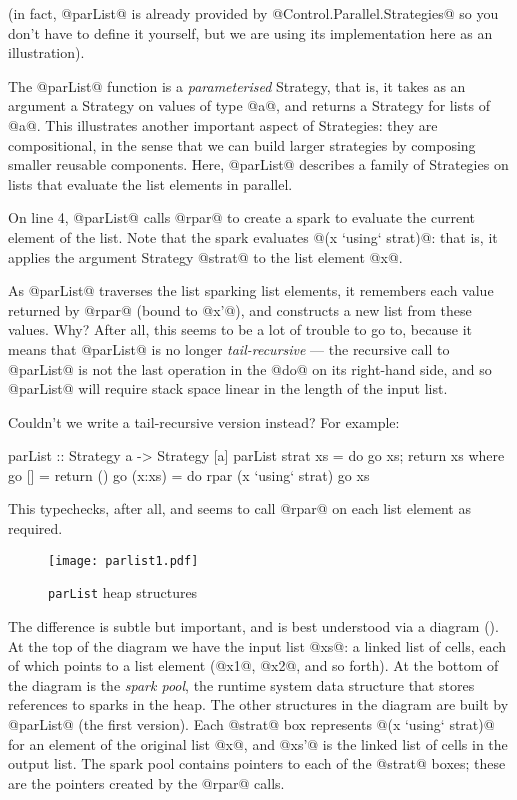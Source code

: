 \noindent (in fact, @parList@ is already provided by
@Control.Parallel.Strategies@ so you don't have to define it yourself,
but we are using its implementation here as an illustration).

The @parList@ function is a \emph{parameterised} Strategy, that is, it
takes as an argument a Strategy on values of type @a@, and returns a
Strategy for lists of @a@.  This illustrates another important aspect
of Strategies: they are compositional, in the sense that we can build
larger strategies by composing smaller reusable components.  Here,
@parList@ describes a family of Strategies on lists that evaluate the
list elements in parallel.

On line 4, @parList@ calls @rpar@ to create a spark to evaluate the
current element of the list.  Note that the spark evaluates
@(x `using` strat)@: that is, it applies the argument Strategy @strat@ to
the list element @x@.

As @parList@ traverses the list sparking list elements, it remembers
each value returned by @rpar@ (bound to @x'@), and constructs a new
list from these values.  Why?  After all, this seems to be a lot of
trouble to go to, because it means that @parList@ is no longer
\emph{tail-recursive} --- the recursive call to @parList@ is not the
last operation in the @do@ on its right-hand side, and so @parList@
will require stack space linear in the length of the input list.

Couldn't we write a tail-recursive version instead?  For example:

\begin{haskell}
parList :: Strategy a -> Strategy [a]
parList strat xs = do go xs; return xs
  where go [] = return ()
        go (x:xs) = do
           rpar (x `using` strat)
           go xs
\end{haskell}

\noindent This typechecks, after all, and seems to call @rpar@ on each
list element as required.

\begin{figure}
\begin{center}
\texttt{[image: parlist1.pdf]}
\end{center}
\caption{\texttt{parList} heap structures}
\label{fig:parlist-heap}
\end{figure}

The difference is subtle but important, and is best understood via a
diagram ().  At the top of the diagram we have
the input list @xs@: a linked list of cells, each of which points to a
list element (@x1@, @x2@, and so forth).  At the bottom of the diagram
is the \emph{spark pool}, the runtime system data structure that
stores references to sparks in the heap.  The other structures in the
diagram are built by @parList@ (the first version).  Each @strat@ box
represents @(x `using` strat)@ for an element of the original list
@x@, and @xs'@ is the linked list of cells in the output list.  The
spark pool contains pointers to each of the @strat@ boxes; these are
the pointers created by the @rpar@ calls.

